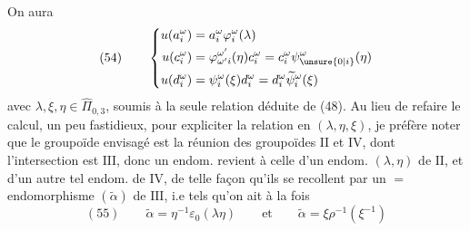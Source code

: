 On aura
\[
(54)\qquad\left\{\begin{aligned}
u(a_i^\omega)&=a_i^\omega\varphi_i^\omega(\lambda)\\
u(c_i^\omega)&=\varphi_{\omega'i}^{\omega'}(\eta)c_i^\omega=c_i^\omega\psi_{\unsure{0|i}}^\omega(\eta)\\
u(d_i^\omega)&=\psi_i^\omega(\xi)d_i^\omega=d_i^\omega\widetilde\psi_i^\omega(\xi)
\end{aligned}\right.
\]
avec $\lambda,\xi,\eta\in\widehat\Pi_{0,3}$, soumis à la seule relation déduite de (48). Au lieu de refaire le calcul, un peu fastidieux, pour expliciter la relation en $(\lambda,\eta,\xi)$, je préfère noter que le  groupoïde envisagé est la réunion des groupoïdes $\mathrm{II}$ et $\mathrm{IV}$, dont l'intersection est $\mathrm{III}$, donc un endom.  revient à celle d'un  endom. $(\lambda,\eta)$ de $\mathrm{II}$, et d'un autre tel endom. \inserted{$\xi$} de $\mathrm{IV}$, de telle façon qu'ils se recollent  par un $=$ endomorphisme $(\widetilde\alpha)$ de $\mathrm{III}$, i.e tels qu'on ait à la fois
\[
(55)\qquad\widetilde\alpha=\eta^{-1}\varepsilon_0(\lambda\eta)\qquad\text{et}\qquad
\widetilde\alpha=\xi\rho^{-1}(\xi^{-1})
\]

